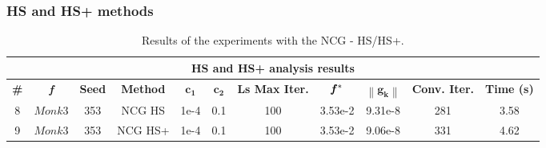 \documentclass[11pt]{article}
\newcommand{\norm}[1]{\left\lVert#1\right\rVert}
\begin{document}
\subsubsection{HS and HS+ methods}
\begin{table}[H]
\small
    \centering
    \begin{tabular}{ |c|c|c|c|c|c|c|c|c|c|c|}
    \hline
     \multicolumn{11}{|c|}{\textbf{HS and HS+ analysis results}} \\
      \hline
       \textbf{\#} & \textbf{\textit{f}} & \textbf{Seed} & \textbf{Method} & $\mathbf{c_1}$ & $\mathbf{c_2}$ & \textbf{Ls Max Iter.} & $\mathbf{\textit{\textbf{f}}\,^*}$ & $\mathbf{\norm{\mathbf{g}_k}}$ & \textbf{Conv. Iter.} & \textbf{Time (s)}\\
     \hline
      8 & $Monk3$ & 353 & NCG HS & 1e-4 & 0.1 & 100 & 3.53e-2 & 9.31e-8 & 281 & 3.58\\
      \hline
      9 & $Monk3$ & 353 & NCG HS+ & 1e-4 & 0.1 & 100 & 3.53e-2 & 9.06e-8 & 331 & 4.62\\
      \hline
    \end{tabular}
    \caption{Results of the experiments with the NCG - HS/HS+.}
    \label{tab:hs_behavior}
\end{table}
\end{document}
